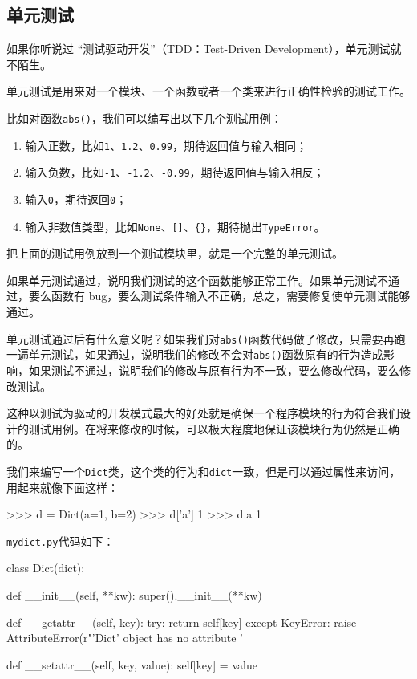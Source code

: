 \hypertarget{ux5355ux5143ux6d4bux8bd5}{%
\subsection{单元测试}\label{ux5355ux5143ux6d4bux8bd5}}

如果你听说过 ``测试驱动开发''（TDD：Test-Driven
Development），单元测试就不陌生。

单元测试是用来对一个模块、一个函数或者一个类来进行正确性检验的测试工作。

比如对函数\texttt{abs()}，我们可以编写出以下几个测试用例：

\begin{enumerate}
\def\labelenumi{\arabic{enumi}.}
\item
  输入正数，比如\texttt{1}、\texttt{1.2}、\texttt{0.99}，期待返回值与输入相同；
\item
  输入负数，比如\texttt{-1}、\texttt{-1.2}、\texttt{-0.99}，期待返回值与输入相反；
\item
  输入\texttt{0}，期待返回\texttt{0}；
\item
  输入非数值类型，比如\texttt{None}、\texttt{{[}{]}}、\texttt{\{\}}，期待抛出\texttt{TypeError}。
\end{enumerate}

把上面的测试用例放到一个测试模块里，就是一个完整的单元测试。

如果单元测试通过，说明我们测试的这个函数能够正常工作。如果单元测试不通过，要么函数有
bug，要么测试条件输入不正确，总之，需要修复使单元测试能够通过。

单元测试通过后有什么意义呢？如果我们对\texttt{abs()}函数代码做了修改，只需要再跑一遍单元测试，如果通过，说明我们的修改不会对\texttt{abs()}函数原有的行为造成影响，如果测试不通过，说明我们的修改与原有行为不一致，要么修改代码，要么修改测试。

这种以测试为驱动的开发模式最大的好处就是确保一个程序模块的行为符合我们设计的测试用例。在将来修改的时候，可以极大程度地保证该模块行为仍然是正确的。

我们来编写一个\texttt{Dict}类，这个类的行为和\texttt{dict}一致，但是可以通过属性来访问，用起来就像下面这样：

\begin{pythoncode}
>>> d = Dict(a=1, b=2)
>>> d['a']
1
>>> d.a
1
\end{pythoncode}

\texttt{mydict.py}代码如下：

\begin{pythoncode}
class Dict(dict):

    def __init__(self, **kw):
        super().__init__(**kw)

    def __getattr__(self, key):
        try:
            return self[key]
        except KeyError:
            raise AttributeError(r"'Dict' object has no attribute '%

    def __setattr__(self, key, value):
        self[key] = value
\end{pythoncode}

